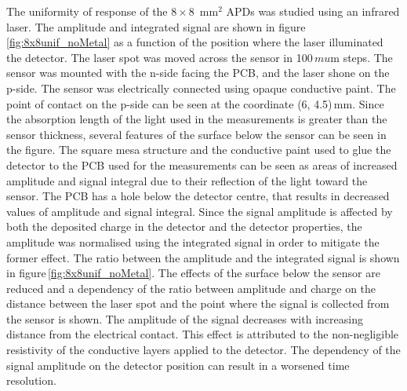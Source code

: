\documentclass[review,number,sort&compress]{elsarticle}
\begin{document}
The uniformity of response of the $8 \times 8$~mm$^2$ APDs was studied using an infrared laser.
The amplitude and integrated signal are shown in figure\,\ref{fig:8x8unif_noMetal} as a function of the position where the laser illuminated the detector.
The laser spot was moved across the sensor in 100\,$mu$m steps.
The sensor was mounted with the n-side facing the PCB, and the laser shone on the p-side.
The sensor was electrically connected using opaque conductive paint.
The point of contact on the p-side can be seen at the coordinate (6, 4.5)\,mm.
Since the absorption length of the light used in the measurements is greater than the sensor thickness, several features of the surface below the sensor can be seen in the figure.
The square mesa structure and the conductive paint used to glue the detector to the PCB used for the measurements can be seen as areas of increased amplitude and signal integral due to their reflection of the light toward the sensor.
The PCB has a hole below the detector centre, that results in decreased values of amplitude and signal integral.
Since the signal amplitude is affected by both the deposited charge in the detector and the detector properties, the amplitude was normalised using the integrated signal in order to mitigate the former effect.
The ratio between the amplitude and the integrated signal is shown in figure\,\ref{fig:8x8unif_noMetal}.
The effects of the surface below the sensor are reduced and a dependency of the ratio between amplitude and charge on the distance between the laser spot and the point where the signal is collected from the sensor is shown.
The amplitude of the signal decreases with increasing distance from the electrical contact.
This effect is attributed to the non-negligible resistivity of the conductive layers applied to the detector.
The dependency of the signal amplitude on the detector position can result in a worsened time resolution.
\end{document}
